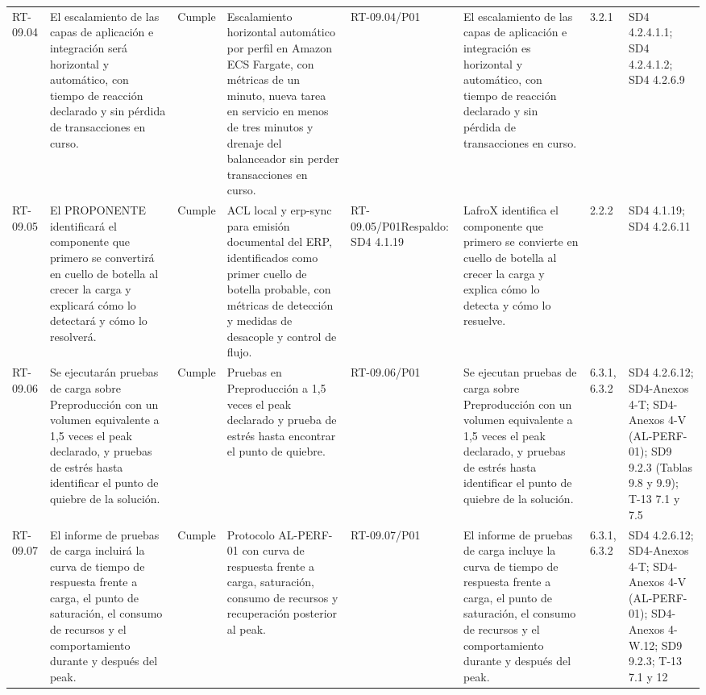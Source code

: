 \documentclass[oficio,firma,final]{lafrox}
\begin{document}
\begin{landscape}
{\begin{longtable}{@{}F{0.054} F{0.173} F{0.061} F{0.191} F{0.106} F{0.180} F{0.067} F{0.168}@{}}
  RT-09.04 & El escalamiento de las capas de aplicación e integración será horizontal y automático, con tiempo de reacción declarado y sin pérdida de transacciones en curso. & Cumple & Escalamiento horizontal automático por perfil en Amazon ECS Fargate, con métricas de un minuto, nueva tarea en servicio en menos de tres minutos y drenaje del balanceador sin perder transacciones en curso. & RT-09.04/\allowbreak{}P01 & El escalamiento de las capas de aplicación e integración es horizontal y automático, con tiempo de reacción declarado y sin pérdida de transacciones en curso. & 3.2.1 & SD4 4.2.4.1.1; SD4 4.2.4.1.2; SD4 4.2.6.9  \\
  RT-09.05 & El PROPONENTE identificará el componente que primero se convertirá en cuello de botella al crecer la carga y explicará cómo lo detectará y cómo lo resolverá. & Cumple & ACL local y erp-sync para emisión documental del ERP, identificados como primer cuello de botella probable, con métricas de detección y medidas de desacople y control de flujo. & RT-09.05/\allowbreak{}P01\newline Respaldo: SD4 4.1.19 & LafroX identifica el componente que primero se convierte en cuello de botella al crecer la carga y explica cómo lo detecta y cómo lo resuelve. & 2.2.2 & SD4 4.1.19; SD4 4.2.6.11  \\
  RT-09.06 & Se ejecutarán pruebas de carga sobre Preproducción con un volumen equivalente a 1,5 veces el peak declarado, y pruebas de estrés hasta identificar el punto de quiebre de la solución. & Cumple & Pruebas en Preproducción a 1,5 veces el peak declarado y prueba de estrés hasta encontrar el punto de quiebre. & RT-09.06/\allowbreak{}P01 & Se ejecutan pruebas de carga sobre Preproducción con un volumen equivalente a 1,5 veces el peak declarado, y pruebas de estrés hasta identificar el punto de quiebre de la solución. & 6.3.1, 6.3.2 & SD4 4.2.6.12; SD4-Anexos 4-T; SD4-Anexos 4-V (AL-PERF-01); SD9 9.2.3 (Tablas 9.8 y 9.9); T-13 7.1 y 7.5  \\
  RT-09.07 & El informe de pruebas de carga incluirá la curva de tiempo de respuesta frente a carga, el punto de saturación, el consumo de recursos y el comportamiento durante y después del peak. & Cumple & Protocolo AL-PERF-01 con curva de respuesta frente a carga, saturación, consumo de recursos y recuperación posterior al peak. & RT-09.07/\allowbreak{}P01 & El informe de pruebas de carga incluye la curva de tiempo de respuesta frente a carga, el punto de saturación, el consumo de recursos y el comportamiento durante y después del peak. & 6.3.1, 6.3.2 & SD4 4.2.6.12; SD4-Anexos 4-T; SD4-Anexos 4-V (AL-PERF-01); SD4-Anexos 4-W.12; SD9 9.2.3; T-13 7.1 y 12  \\

\end{longtable}}
\end{landscape}
\end{document}
